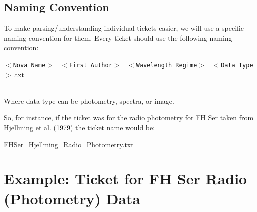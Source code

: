 \documentclass{article}
\begin{document}

\subsection{Naming Convention}
To make parsing/understanding individual tickets easier, we will use a specific naming convention for them. Every ticket should use the following naming convention:\\

\noindent
\begin{Large}
$<$\texttt{Nova Name}$>$\_$<$\texttt{First Author}$>$\_$<$\texttt{Wavelength Regime}$>$\_$<$\texttt{Data Type}$>$.txt
\end{Large}
\\
Where data type can be photometry, spectra, or image.

So, for instance, if the ticket was for the radio photometry for FH Ser taken from Hjellming et al. (1979) the ticket name would be:
\\

\noindent
\begin{Large}
FHSer\_Hjellming\_Radio\_Photometry.txt
\end{Large}






\newpage
\appendix
\section{Example: Ticket for FH Ser Radio (Photometry) Data}
\end{document}
